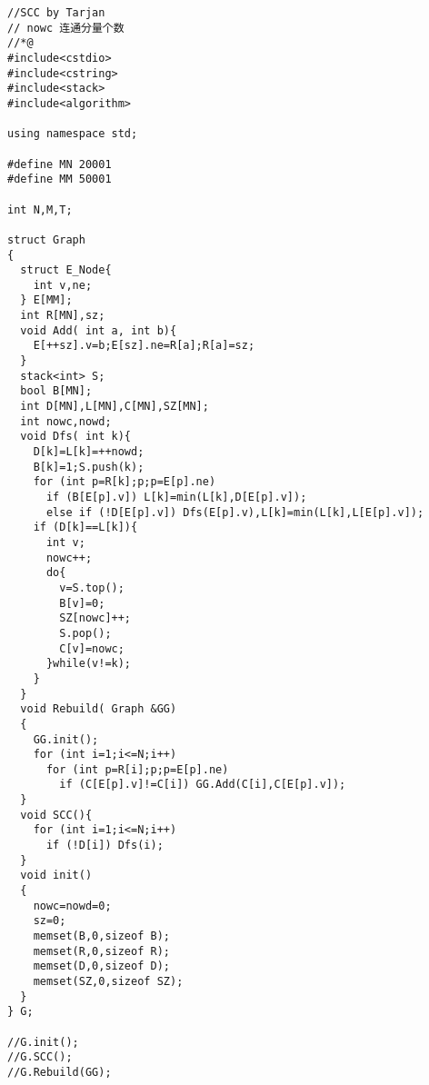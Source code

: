 \begin{lstlisting}[language={}]
//SCC by Tarjan
// nowc 连通分量个数
//*@
#include<cstdio>
#include<cstring>
#include<stack>
#include<algorithm>
 
using namespace std;

#define MN 20001
#define MM 50001

int N,M,T;

struct Graph
{
  struct E_Node{
    int v,ne;
  } E[MM];
  int R[MN],sz;
  void Add( int a, int b){
    E[++sz].v=b;E[sz].ne=R[a];R[a]=sz;
  }
  stack<int> S;
  bool B[MN];
  int D[MN],L[MN],C[MN],SZ[MN];
  int nowc,nowd;
  void Dfs( int k){
    D[k]=L[k]=++nowd;
    B[k]=1;S.push(k);
    for (int p=R[k];p;p=E[p].ne)
      if (B[E[p].v]) L[k]=min(L[k],D[E[p].v]);
      else if (!D[E[p].v]) Dfs(E[p].v),L[k]=min(L[k],L[E[p].v]);
    if (D[k]==L[k]){
      int v;
      nowc++;
      do{
        v=S.top();
        B[v]=0;
        SZ[nowc]++;
        S.pop();
        C[v]=nowc;
      }while(v!=k);
    }
  }
  void Rebuild( Graph &GG)
  {
    GG.init();
    for (int i=1;i<=N;i++)
      for (int p=R[i];p;p=E[p].ne)
        if (C[E[p].v]!=C[i]) GG.Add(C[i],C[E[p].v]);
  }
  void SCC(){
    for (int i=1;i<=N;i++)
      if (!D[i]) Dfs(i);
  }
  void init()
  {
    nowc=nowd=0;
    sz=0;
    memset(B,0,sizeof B);
    memset(R,0,sizeof R);
    memset(D,0,sizeof D);
    memset(SZ,0,sizeof SZ);
  }
} G;

//G.init();
//G.SCC();
//G.Rebuild(GG);
\end{lstlisting}
